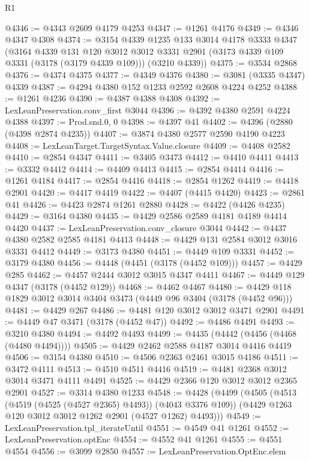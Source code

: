 \begin{lexlean}{R1}
\begin{coremodule}
@4346 := @4343 @2609 @4179 @4253
@4347 := @1261 @4176
@4349 := @4346 @4347 @4308
@4374 := @3154
    @4339
    @1235
    @133
    @3014
    @4178
    @3333
    @4347
    (@3164
      @4339
      @131
      @120
      @3012
      @3012
      @3331
      @2901
      (@3173 @4339 @109 @3331 (@3178 (@3179 @4339 @109)))
      (@3210 @4339))
@4375 := @3534 @2868
@4376 := @4374 @4375
@4377 := @4349 @4376
@4380 := @3081 (@3335 @4347) @4339
@4387 := @4294 @4380 @152 @1233 @2592 @2608 @4224 @4252
@4388 := @1261 @4236
@4390 := @4387 @4388 @4308
@4392 := LexLeanPreservation.conv_first @3044
@4396 := @4392 @4380 @2591 @4224 @4388
@4397 := Prod.snd.{0, 0}
@4398 := @4397 @41
@4402 := @4396 (@2880 (@4398 @2874 @4235))
@4407 := @3874 @4380 @2577 @2590 @4190 @4223
@4408 := LexLeanTarget.TargetSyntax.Value.closure
@4409 := @4408 @2582
@4410 := @2854 @4347
@4411 := @3405 @3473
@4412 := @4410 @4411
@4413 := @3332 @4412
@4414 := @4409 @4413
@4415 := @2854 @4414
@4416 := @1261 @4184
@4417 := @2854 @4416
@4418 := @2854 @1262
@4419 := @4418 @2901
@4420 := @4417 @4419
@4422 := @4407 (@4415 @4420)
@4423 := @2861 @41
@4426 := @4423 @2874 @1261 @2880
@4428 := @4422 (@4426 @4235)
@4429 := @3164 @4380
@4435 := @4429 @2586 @2589 @4181 @4189 @4414 @4420
@4437 := LexLeanPreservation.conv_closure @3044
@4442 := @4437 @4380 @2582 @2585 @4181 @4413
@4448 := @4429 @131 @2584 @3012 @3016 @3331 @4412
@4449 := @3173 @4380
@4451 := @4449 @109 @3331
@4452 := @3179 @4380
@4456 := @4448 (@4451 (@3178 (@4452 @109)))
@4457 := @4429 @285
@4462 := @4457 @2444 @3012 @3015 @4347 @4411
@4467 := @4449 @129 @4347 (@3178 (@4452 @129))
@4468 := @4462 @4467
@4480 := @4429 @118 @1829 @3012 @3014 @3404 @3473 (@4449 @96 @3404 (@3178 (@4452 @96)))
@4481 := @4429 @267
@4486 := @4481 @120 @3012 @3012 @3471 @2901
@4491 := @4449 @47 @3471 (@3178 (@4452 @47))
@4492 := @4486 @4491
@4493 := @3210 @4380
@4494 := @4492 @4493
@4499 := @4435 (@4442 (@4456 (@4468 (@4480 @4494))))
@4505 := @4429 @2462 @2588 @4187 @3014 @4416 @4419
@4506 := @3154 @4380
@4510 := @4506 @2363 @2461 @3015 @4186
@4511 := @3472 @4111
@4513 := @4510 @4511 @4416
@4519 := @4481 @2368 @3012 @3014 @3471 @4111 @4491
@4525 := @4429 @2366 @120 @3012 @3012 @2365 @2901
@4527 := @3314 @4380 @1233
@4548 := @4428
    (@4499
      (@4505
        (@4513 (@4519 (@4525 (@4527 @2365) @4493)) (@4043 @3376 @109))
        (@4429 @1263 @120 @3012 @3012 @1262 @2901 (@4527 @1262) @4493)))
@4549 := LexLeanPreservation.tpl_iterateUntil
@4551 := @4549 @41 @1261
@4552 := LexLeanPreservation.optEnc
@4554 := @4552 @41 @1261
@4555 := @4551 @4554
@4556 := @3099 @2850
@4557 := LexLeanPreservation.OptEnc.elem

\end{coremodule}
\end{lexlean}
